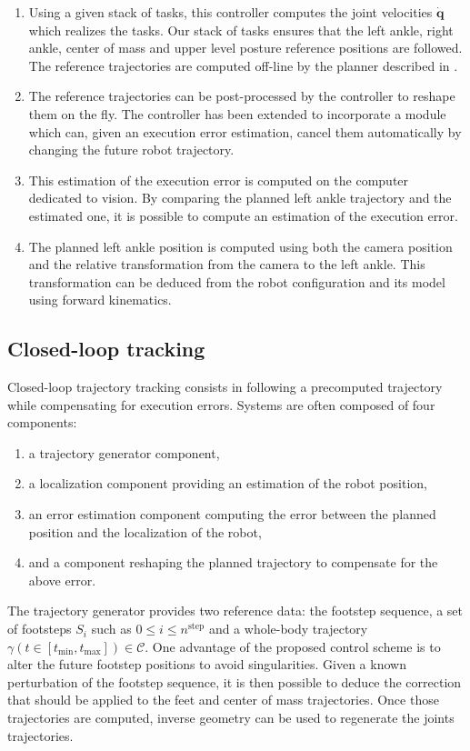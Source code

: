 \begin{enumerate}
\item Using a given stack of tasks, this controller computes the joint
  velocities $\mathbf{\dot{q}}$ which realizes the tasks. Our stack of
  tasks ensures that the left ankle, right ankle, center of mass and
  upper level posture reference positions are followed. The reference
  trajectories are computed off-line by the planner described in
  \cite{Dalibard11humanoids}.
\item The reference trajectories can be post-processed by the
  controller to reshape them on the fly. The controller has been
  extended to incorporate a module which can, given an execution error
  estimation, cancel them automatically by changing the future robot
  trajectory.
\item This estimation of the execution error is computed on the
  computer dedicated to vision. By comparing the planned left ankle
  trajectory and the estimated one, it is possible to compute an
  estimation of the execution error.
\item The planned left ankle position is computed using both the
  camera position and the relative transformation from the camera to
  the left ankle. This transformation can be deduced from the robot
  configuration and its model using forward kinematics.
\end{enumerate}

\subsection{Closed-loop tracking}

Closed-loop trajectory tracking consists in following a precomputed
trajectory while compensating for execution errors. Systems are often
composed of four components:
\begin{enumerate}
\item a trajectory generator component,
\item a localization component providing an estimation of the robot
  position,
\item an error estimation component computing the error between the
  planned position and the localization of the robot,
\item and a component reshaping the planned trajectory to compensate
  for the above error.
\end{enumerate}


The trajectory generator provides two reference data: the footstep
sequence, a set of footsteps $S_i$ such as \mbox{$0 \leq i \leq
  n^{\text{step}}$} and a whole-body trajectory \mbox{$\gamma(t \in
  [t_{\text{min}}, t_{\text{max}}]) \in \mathcal{C}$}. One advantage
of the proposed control scheme is to alter the future footstep
positions to avoid singularities. Given a known perturbation of the
footstep sequence, it is then possible to deduce the correction that
should be applied to the feet and center of mass trajectories. Once
those trajectories are computed, inverse geometry can be used to
regenerate the joints trajectories.


